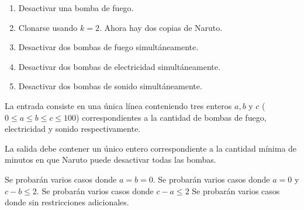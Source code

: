 \documentclass{oci}
\begin{document}
\begin{problemDescription}
\begin{enumerate}
\item Desactivar una bomba de fuego.
\item Clonarse usando $k = 2$. Ahora hay dos copias de Naruto.
\item Desactivar dos bombas de fuego simultáneamente.
\item Desactivar dos bombas de electricidad simultáneamente.
\item Desactivar dos bombas de sonido simultáneamente.
\end{enumerate}

\end{problemDescription}

\begin{inputDescription}
  La entrada consiste en una única línea conteniendo tres enteros $a, b$ y $c$
  ($0\leq a \leq b \leq c \leq 100$) correspondientes a la cantidad de bombas de fuego,
  electricidad y sonido respectivamente.
\end{inputDescription}

\begin{outputDescription}
  La salida debe contener un único entero correspondiente a la cantidad mínima
  de minutos en que Naruto puede desactivar todas las bombas.
\end{outputDescription}

\begin{scoreDescription}
   Se probarán varios casos donde $a = b = 0$.
   Se probarán varios casos donde $a = 0$ y $c - b \leq 2$.
   Se probarán varios casos donde $c - a \leq 2$
   Se probarán varios casos donde sin restricciones adicionales.
\end{scoreDescription}

\begin{sampleDescription}
\end{sampleDescription}
\end{document}
